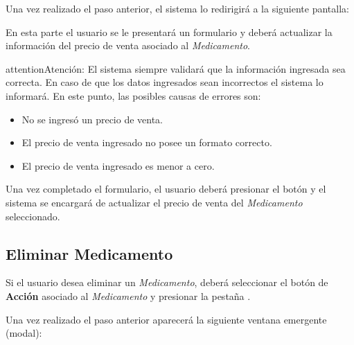 \documentclass[a4paper,10pt,spanish]{sphinxmanual}
\begin{document}

Una vez realizado el paso anterior, el sistema lo redirigirá a la siguiente pantalla:


En esta parte el usuario se le presentará un formulario y deberá actualizar la información del precio de venta asociado al \emph{Medicamento}.

\begin{notice}{attention}{Atención:}
El sistema siempre validará que la información ingresada sea correcta. En caso de que los datos ingresados sean incorrectos el sistema lo informará.
En este punto, las posibles causas de errores son:
\begin{itemize}
\item {} 
No se ingresó un precio de venta.

\item {} 
El precio de venta ingresado no posee un formato correcto.

\item {} 
El precio de venta ingresado es menor a cero.

\end{itemize}
\end{notice}

Una vez completado el formulario, el usuario deberá presionar el botón  y el sistema se encargará de actualizar el precio de venta del \emph{Medicamento} seleccionado.


\subsection{Eliminar Medicamento}
\label{medicams:eliminar-medicamento}\label{medicams:id3}
Si el usuario desea eliminar un \emph{Medicamento}, deberá seleccionar el botón de \textbf{Acción} asociado al \emph{Medicamento} y presionar la pestaña .


Una vez realizado el paso anterior aparecerá la siguiente ventana emergente (modal):
\end{document}
